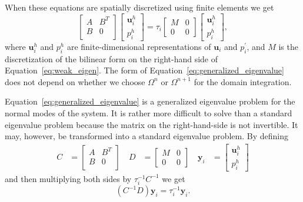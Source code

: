 \documentclass[preprint,12pt,authoryear]{elsarticle}
\begin{document}
When these equations are spatially discretized using finite elements \citep[see, e.g.][]{kronbichler2012high} we get
\begin{equation}
\begin{bmatrix}
A & B^T \\
B & 0 \\
\end{bmatrix}
\begin{bmatrix}
\mathbf{u}^h_i \\
p^h_i
\end{bmatrix}
=
\tau_i
\begin{bmatrix}
M & 0 \\
0 & 0
\end{bmatrix}
\begin{bmatrix}
\mathbf{u}^h_i \\
p^h_i
\end{bmatrix},
\label{eq:generalized_eigenvalue}
\end{equation}
where $\mathbf{u}^h_i$ and $p^h_i$ are finite-dimensional representations of $\mathbf{u}_i$ and $p^\prime_i$,
and $M$ is the discretization of the bilinear form on the right-hand side of Equation~\eqref{eq:weak_eigen}.
The form of Equation~\eqref{eq:generalized_eigenvalue} does not depend on whether we choose $\Omega^n$ or $\Omega^{n+1}$
for the domain integration.

Equation~\eqref{eq:generalized_eigenvalue} is a generalized eigenvalue problem for the normal modes of the system.
It is rather more difficult to solve than a standard eigenvalue problem because the matrix on the right-hand-side 
is not invertible. It may, however, be transformed into a standard eigenvalue problem.
By defining
\begin{equation}
\begin{aligned}
C &= 
\begin{bmatrix}
A & B^T \\
B & 0 \\
\end{bmatrix} \quad
D &= 
\begin{bmatrix}
M & 0 \\
0 & 0
\end{bmatrix} \quad
\mathbf{y}_i &= 
\begin{bmatrix}
\mathbf{u}^h_i \\
p^h_i
\end{bmatrix} 
\end{aligned}
\label{eq:eigen_substitution}
\end{equation}
and then multiplying both sides by $\tau_i^{-1}C^{-1}$ we get
\begin{equation}
(C^{-1}D)\mathbf{y}_i = \tau_i^{-1} \mathbf{y}_i.
\label{eq:standard_eigenvalue}
\end{equation}
\end{document}
